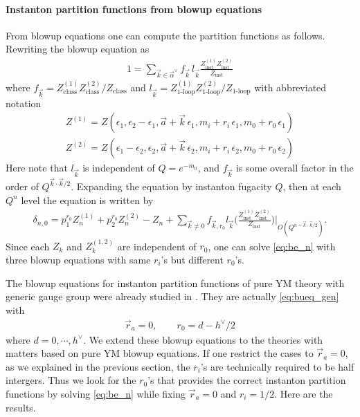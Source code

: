 \documentclass[letterpaper, 11pt]{article}
\begin{document}
\paragraph{Instanton partition functions from blowup equations}
From blowup equations one can compute the partition functions as follows. Rewriting the blowup equation as
\begin{align}
1=\sum_{\vec{k}\in\vec{\alpha}^{\lor}}f_{\vec{k}}\,l_{\vec{k}}\frac{Z^{(1)}_{\textrm{inst}}Z^{(2)}_{\textrm{inst}}}{Z_{\textrm{inst}}}
\end{align}
where $f_{\vec{k}}=Z^{(1)}_{\textrm{class}}Z^{(2)}_{\textrm{class}}/Z_{\textrm{class}}$ and $l_{\vec{k}}=Z^{(1)}_{\textrm{1-loop}}Z^{(2)}_{\textrm{1-loop}}/Z_{\textrm{1-loop}}$ with abbreviated notation 
\begin{align}
Z^{(1)}=Z(\epsilon_1,\epsilon_2-\epsilon_1,\vec{a}+\vec{k}\,\epsilon_1,m_i+r_i\,\epsilon_1,m_0+r_0\,\epsilon_1)\nonumber\\
Z^{(2)}=Z(\epsilon_1-\epsilon_2,\epsilon_2,\vec{a}+\vec{k}\,\epsilon_2,m_i+r_i\,\epsilon_2,m_0+r_0\,\epsilon_2)
\end{align} 
Here note that $l_{\vec{k}}$ is independent of $Q=e^{-m_0}$, and $f_{\vec{k}}$ is some overall factor in the order of $Q^{\vec{k}\cdot\vec{k}/2}$. Expanding the equation by instanton fugacity $Q$, then at each $Q^{n}$ level the equation is written by 
\begin{align}
\delta_{n,0}=p_1^{r_0}Z^{(1)}_{n}+p_2^{r_0}Z^{(2)}_{n}-Z_{n}+\sum_{\vec{k}\neq 0}f_{\vec{k},r_0}l_{\vec{k}}\Bigg(\frac{Z^{(1)}_{\textrm{inst}}Z^{(2)}_{\textrm{inst}}}{Z_{\textrm{inst}}}\Bigg)\Bigg|_{O(Q^{n-\vec{k}\cdot\vec{k}/2})}.
\label{eq:be_n}
\end{align}
Since each $Z_{k}$ and $Z^{(1,2)}_{k}$ are independent of $r_0$, one can solve \eqref{eq:be_n} with three blowup equations with same $r_i$'s but different $r_0$'s. 

The blowup equations for instanton partition functions of pure YM theory with generic gauge group were already studied in \cite{Keller:2012da}. They are actually \eqref{eq:bueq_gen} with 
\begin{align}
\vec{r}_a=0,\qquad r_0=d-h^{\lor}/2
\end{align}
where $d=0,\cdots, h^{\lor}$. We extend these blowup equations to the theories with matters based on pure YM blowup equations. If one restrict the cases to $\vec{r}_a=0$, as we explained in the previous section, the $r_i$'s are technically required to be half intergers. Thus we look for the $r_0$'s that provides the correct instanton partition functions by solving \eqref{eq:be_n} while fixing $\vec{r}_a=0$ and $r_i=1/2$. Here are the results.
\end{document}
